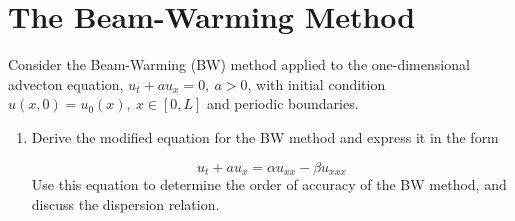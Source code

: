 \pagebreak
\section{The Beam-Warming Method}
Consider the Beam-Warming (BW) method applied to the one-dimensional advecton equation, $u_t + au_x= 0,\ a >0$, with initial condition $u(x,0) =u_0(x),\ x \in [0,L]$ and periodic boundaries.

\begin{enumerate}[label=\alph*., start = 1]
    \item Derive the modified equation for the BW method and express it in the form
    
    \vspace{-0.2in}
    \begin{equation*}
        u_t + au_x = \alpha u_{xx} - \beta u_{xxx}
    \end{equation*}
    Use this equation to determine the order of accuracy of the BW method, and discuss the dispersion relation.


\end{enumerate}
